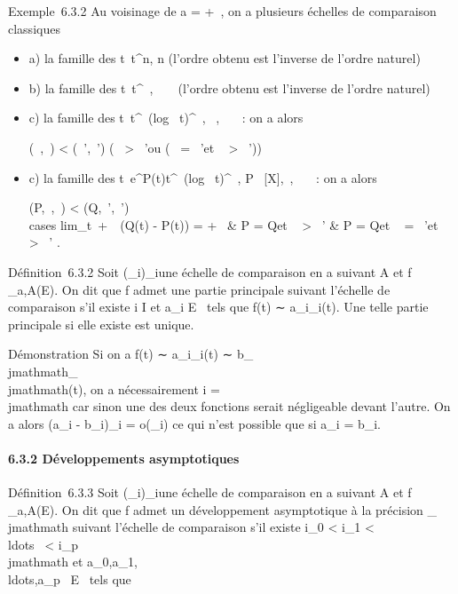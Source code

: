 \documentclass[]{article}
\begin{document}
Exemple~6.3.2 Au voisinage de a = +\infty~, on a plusieurs échelles de
comparaison classiques

\begin{itemize}
\item
  a) la famille des t\mapsto~t^n, n \in {}
  (l'ordre obtenu est l'inverse de l'ordre naturel)
\item
  b) la famille des t\mapsto~t^\alpha~, \alpha~ \in {}~
  (l'ordre obtenu est l'inverse de l'ordre naturel)
\item
  c) la famille des
  t\mapsto~t^\alpha~(log~
  t)^\beta~, \alpha~,\beta~ \in {}~~: on a alors

  (\alpha~,\beta~) \textless{} (\alpha~',\beta~') \Leftrightarrow
  \bigl (\alpha~ \textgreater{} \alpha~'\text ou
  (\alpha~ = \alpha~'\text et \beta~ \textgreater{}
  \beta~')\bigr )
\item
  c) la famille des
  t\mapsto~e^P(t)t^\alpha~(log~
  t)^\beta~, P \in {}~{[}X{]},\alpha~,\beta~ \in {}~~: on a alors

  (P,\alpha~,\beta~) \textless{} (Q,\alpha~',\beta~') \Leftrightarrow
  \left \\cases
  lim_t\rightarrow~+\infty~~(Q(t) - P(t)) = +\infty~
  \cr \cr \textou &
  \cr P = Q\text et \alpha~ \textgreater{}
  \alpha~' \cr \textou & \cr
  P = Q\text et \alpha~ = \alpha~'\text et \beta~
  \textgreater{} \beta~'  \right .
\end{itemize}

Définition~6.3.2 Soit (\phi_i)_i\inI une échelle de
comparaison en a suivant A et f _a,A(E). On dit que f admet
une partie principale suivant l'échelle de comparaison s'il existe i \in I
et a_i \in E \diagdown\0\ tels que f(t)
∼ a_i\phi_i(t). Une telle partie principale si elle
existe est unique.

Démonstration Si on a f(t) ∼ a_i\phi_i(t) ∼
b_\\jmathmath\phi_\\jmathmath(t), on a nécessairement i = \\jmathmath car sinon une des
deux fonctions serait négligeable devant l'autre. On a alors
(a_i - b_i)\phi_i = o(\phi_i) ce qui n'est
possible que si a_i = b_i.

\paragraph{6.3.2 Développements asymptotiques}

Définition~6.3.3 Soit (\phi_i)_i\inI une échelle de
comparaison en a suivant A et f _a,A(E). On dit que f admet
un développement asymptotique à la précision \phi_\\jmathmath suivant
l'échelle de comparaison s'il existe i_0 \textless{}
i_1 \textless{}
\\ldots~ \textless{}
i_p \leq \\jmathmath et
a_0,a_1,\\ldots,a_p~
\in E \diagdown\0\ tels que
\end{document}
